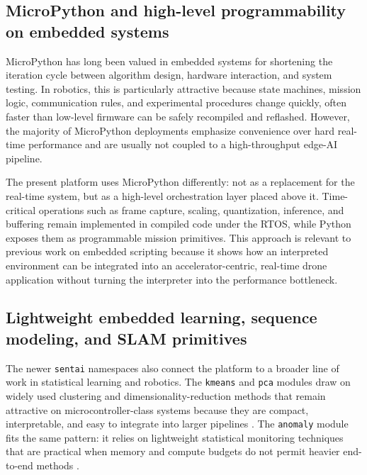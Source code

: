 \subsection{MicroPython and high-level programmability on embedded
systems}\label{micropython-and-high-level-programmability-on-embedded-systems}

MicroPython has long been valued in embedded systems for shortening the
iteration cycle between algorithm design, hardware interaction, and
system testing. In robotics, this is particularly attractive because
state machines, mission logic, communication rules, and experimental
procedures change quickly, often faster than low-level firmware can be
safely recompiled and reflashed. However, the majority of MicroPython
deployments emphasize convenience over hard real-time performance and
are usually not coupled to a high-throughput edge-AI pipeline.

The present platform uses MicroPython differently: not as a replacement
for the real-time system, but as a high-level orchestration layer placed
above it. Time-critical operations such as frame capture, scaling,
quantization, inference, and buffering remain implemented in compiled
code under the RTOS, while Python exposes them as programmable mission
primitives. This approach is relevant to previous work on embedded
scripting because it shows how an interpreted environment can be
integrated into an accelerator-centric, real-time drone application
without turning the interpreter into the performance bottleneck.

\subsection{Lightweight embedded learning, sequence modeling, and SLAM
primitives}\label{lightweight-embedded-learning-sequence-modeling-and-slam-primitives}

The newer \texttt{sentai} namespaces also connect the platform to a
broader line of work in statistical learning and robotics. The
\texttt{kmeans} and \texttt{pca} modules draw on widely used clustering
and dimensionality-reduction methods that remain attractive on
microcontroller-class systems because they are compact, interpretable,
and easy to integrate into larger pipelines
\citep{Jain2010, Jolliffe2016}. The \texttt{anomaly} module fits the
same pattern: it relies on lightweight statistical monitoring techniques
that are practical when memory and compute budgets do not permit heavier
end-to-end methods \citep{Chandola2009, Pimentel2014}.

